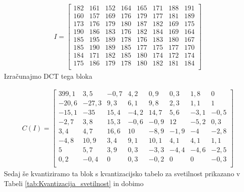 \documentclass[a4paper,12pt,openright]{book}
\begin{document}
\begin{gather*}
 I =
  \begin{bmatrix}
 182& 161& 152& 164& 165& 171& 188& 191\\
 160& 157& 169& 176& 179& 177& 181& 189\\
 173& 176& 179& 180& 187& 182& 169& 175\\
 190& 186& 183& 176& 182& 184& 169& 164\\
 185& 195& 189& 178& 176& 183& 180& 167\\
 185& 190& 189& 185& 177& 175& 177& 170\\
 184& 171& 182& 185& 180& 174& 172& 174\\
 175& 186& 179& 178& 180& 182& 181& 184\\
   \end{bmatrix}
\end{gather*}
Izračunajmo DCT tega bloka

\begin{gather}
 C(I) =
  \begin{bmatrix}
 399,1&   3,5&  -0,7&   4,2&   0,9&   0,3&   1,8&   0 \\
 -20,6& -27,3&   9,3&   6,1&   9,8&   2,3&   1,1&   1 \\
 -15,1& -35 &  15,4&  -4,2&  14,7&   5,6&  -3,1&  -0,5\\
  -2,7&   3,8&  15,3&  -0,6&  -0,9&  12 &  -5,2&   0,3\\
   3,4&   4,7&  16,6&  10 &  -8,9&  -1,9&  -4 &  -2,8\\
  -4,8&  10,9&   3,4&   9,1&  10,1&   4,1&   4,1&   1,1\\
   5 &   5,7&   3,9&   0,3&  -3,3&  -4,4&  -4,6&  -2,5\\
   0,2&  -0,4&  0 &   0,3&  -0,2&  0 &  0 &  -0,3\\
   \end{bmatrix}
\end{gather}
Sedaj še kvantiziramo ta blok s kvantizacijsko tabelo za svetilnost prikazano v Tabeli \ref{tab:Kvantizacija_svetilnost} in dobimo
\end{document}
